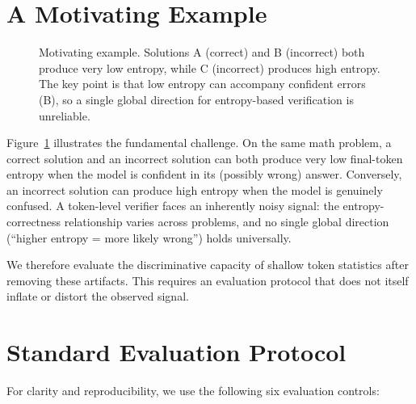 \documentclass{article}
\begin{document}
\section{A Motivating Example}
\label{sec:motivation}

\begin{figure}[t]
\centering
{}
\caption{Motivating example. Solutions A (correct) and B (incorrect) both produce very low entropy, while C (incorrect) produces high entropy. The key point is that low entropy can accompany confident errors (B), so a single global direction for entropy-based verification is unreliable.}
\label{fig:motivation}
\end{figure}

Figure~\ref{fig:motivation} illustrates the fundamental challenge. On the same math problem, a correct solution and an incorrect solution can both produce very low final-token entropy when the model is confident in its (possibly wrong) answer. Conversely, an incorrect solution can produce high entropy when the model is genuinely confused. A token-level verifier faces an inherently noisy signal: the entropy-correctness relationship varies across problems, and no single global direction (``higher entropy = more likely wrong'') holds universally.

We therefore evaluate the discriminative capacity of shallow token statistics after removing these artifacts. This requires an evaluation protocol that does not itself inflate or distort the observed signal.

\section{Standard Evaluation Protocol}
\label{sec:sep}

For clarity and reproducibility, we use the following six evaluation controls:
\end{document}
